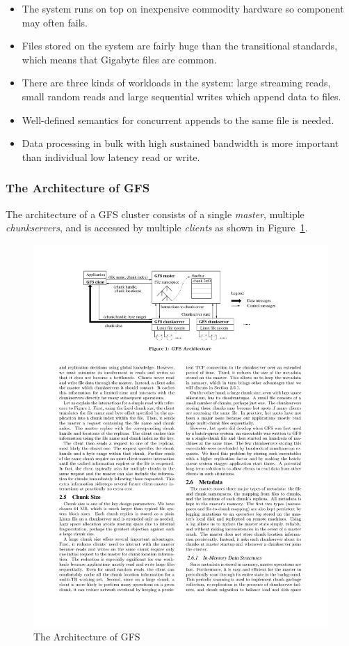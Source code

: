 \begin{itemize}[noitemsep]
	\item The system runs on top on inexpensive commodity hardware so component may often fails.
	\item Files stored on the system are fairly huge than the transitional standards, which means that Gigabyte files are common.
	\item There are three kinds of workloads in the system: large streaming reads, small random reads and large sequential writes which append data to files.
	\item Well-defined semantics for concurrent appends to the same file is needed.
	\item Data processing in bulk with high sustained bandwidth is more important than individual low latency read or write.
\end{itemize}

\subsubsection{The Architecture of GFS}
\noindent The architecture of a GFS cluster consists of a single \textit{master}, multiple \textit{chunkservers}, and is accessed by multiple \textit{clients} as shown in Figure~\ref{fig:gfs}.

\begin{figure}[h]
	\centering
	\includegraphics[width=\linewidth]{figs/GFSArchitecture.pdf}
	\caption{The Architecture of GFS \protect \cite{ghemawat2003google}}
	\label{fig:gfs}
\end{figure}

